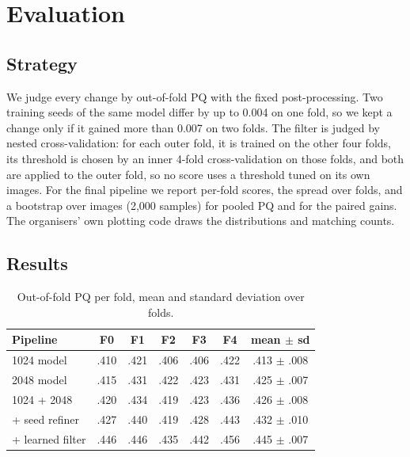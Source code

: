 \documentclass[sigconf]{acmart}
\begin{document}
\section{Evaluation}\label{sec:evaluation}

\subsection{Strategy}

We judge every change by out-of-fold PQ with the fixed post-processing. Two training seeds of
the same model differ by up to 0.004 on one fold, so we kept a change only if it gained more
than 0.007 on two folds. The filter is judged by nested cross-validation: for each outer
fold, it is trained on the other four folds, its threshold is chosen by an inner 4-fold
cross-validation on those folds, and both are applied to the outer fold, so no score uses a
threshold tuned on its own images. For the final pipeline we report per-fold scores, the
spread over folds, and a bootstrap over images (2,000 samples) for pooled PQ and for the
paired gains. The organisers' own plotting code draws the distributions and matching counts.

\subsection{Results}

\begin{table}[t]
\caption{Out-of-fold PQ per fold, mean and standard deviation over folds.}
\label{tab:folds}
\centering
\small
\begin{tabular}{lccccc|c}
\toprule
Pipeline & F0 & F1 & F2 & F3 & F4 & mean $\pm$ sd \\
\midrule
1024 model & .410 & .421 & .406 & .406 & .422 & .413 $\pm$ .008 \\
2048 model & .415 & .431 & .422 & .423 & .431 & .425 $\pm$ .007 \\
1024 + 2048 & .420 & .434 & .419 & .423 & .436 & .426 $\pm$ .008 \\
+ seed refiner & .427 & .440 & .419 & .428 & .443 & .432 $\pm$ .010 \\
+ learned filter & .446 & .446 & .435 & .442 & .456 & .445 $\pm$ .007 \\
\bottomrule
\end{tabular}
\end{table}
\end{document}
